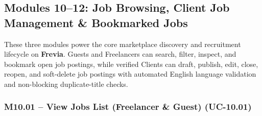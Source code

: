 
\newpage
\subsection{Modules 10--12: Job Browsing, Client Job Management \& Bookmarked Jobs}

These three modules power the core marketplace discovery and recruitment lifecycle on \textbf{Frevia}. Guests and Freelancers can search, filter, inspect, and bookmark open job postings, while verified Clients can draft, publish, edit, close, reopen, and soft-delete job postings with automated English language validation and non-blocking duplicate-title checks.

\subsubsection[M10.01 -- View Jobs List (UC-10.01)]{M10.01 -- View Jobs List (Freelancer \& Guest) (UC-10.01)}

